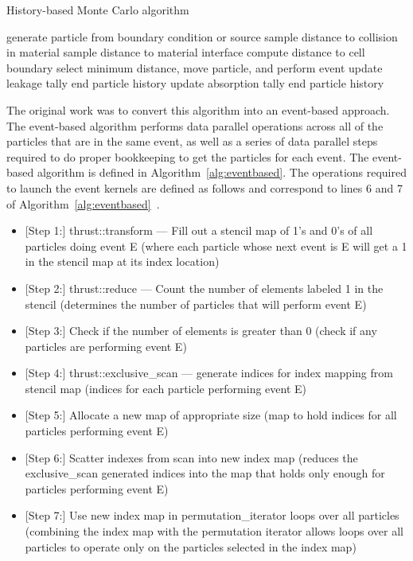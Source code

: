 \begin{algorithm}
\DontPrintSemicolon
\caption{History-based Monte Carlo algorithm}
\label{alg:history-based}
{ 
    generate particle from boundary condition or source\;
    {
       sample distance to collision in material\;
       sample distance to material interface\;
       compute distance to cell boundary\;
       select minimum distance, move particle, and perform event\;
       {
          update leakage tally\;
          end particle history\;
       }
       {
          update absorption tally\;
          end particle history\;
       }
    }
}
\end{algorithm}
%

%
The original work was to convert this algorithm into an event-based approach.
%
The event-based algorithm performs data parallel operations across all of the particles that are in the same event, as well as a series of data parallel steps required to do proper bookkeeping to get the particles for each event.
%
The event-based algorithm is defined in Algorithm~\ref{alg:eventbased}.
%
The operations required to launch the event kernels are defined as follows and correspond to lines 6 and 7 of Algorithm~\ref{alg:eventbased}~\cite{alpsmc1}.
%
\begin{itemize}
\item{[Step 1:]} thrust::transform --- Fill out a stencil map of 1's and 0's of all particles doing event E (where each particle whose next event is E will get a 1 in the stencil map at its index location)
\item{[Step 2:]} thrust::reduce --- Count the number of elements labeled 1 in the stencil (determines the number of particles that will perform event E)
\item{[Step 3:]} Check if the number of elements is greater than 0 (check if any particles are performing event E)
\item{[Step 4:]} thrust::exclusive\_scan --- generate indices for index mapping from stencil map (indices for each particle performing event E)
\item{[Step 5:]} Allocate a new map of appropriate size (map to hold indices for all particles performing event E)
\item{[Step 6:]} Scatter indexes from scan into new index map (reduces the exclusive\_scan generated indices into the map that holds only enough for particles performing event E)
\item{[Step 7:]} Use new index map in permutation\_iterator loops over all particles (combining the index map with the permutation iterator allows loops over all particles to operate only on the particles selected in the index map)
\end{itemize}
%

